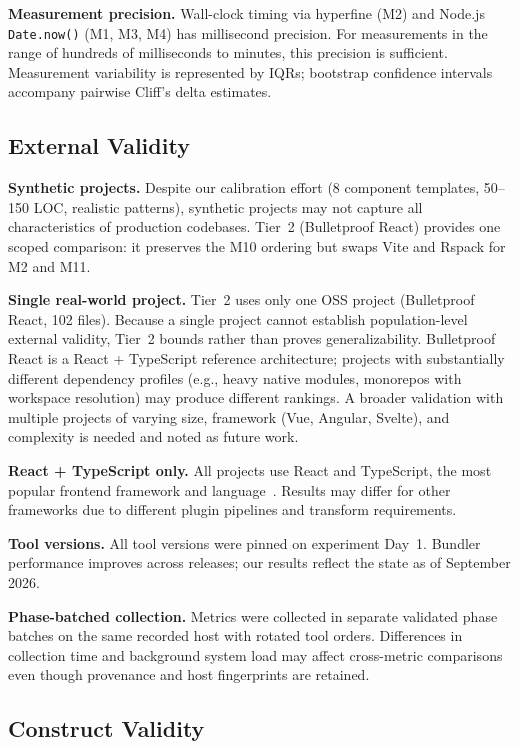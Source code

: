 \documentclass[preprint,12pt]{elsarticle}
\begin{document}
\textbf{Measurement precision.}
Wall-clock timing via hyperfine (M2) and Node.js \texttt{Date.now()} (M1, M3, M4) has millisecond precision.
For measurements in the range of hundreds of milliseconds to minutes, this precision is sufficient.
Measurement variability is represented by IQRs; bootstrap confidence intervals accompany pairwise Cliff's delta estimates.

\subsection{External Validity}

\textbf{Synthetic projects.}
Despite our calibration effort (8 component templates, 50--150 LOC, realistic patterns), synthetic projects may not capture all characteristics of production codebases.
Tier~2 (Bulletproof React) provides one scoped comparison: it preserves the M10 ordering but swaps Vite and Rspack for M2 and M11.

\textbf{Single real-world project.}
Tier~2 uses only one OSS project (Bulletproof React, 102 files).
Because a single project cannot establish population-level external validity, Tier~2 bounds rather than proves generalizability.
Bulletproof React is a React + TypeScript reference architecture; projects with substantially different dependency profiles (e.g., heavy native modules, monorepos with workspace resolution) may produce different rankings.
A broader validation with multiple projects of varying size, framework (Vue, Angular, Svelte), and complexity is needed and noted as future work.

\textbf{React + TypeScript only.}
All projects use React and TypeScript, the most popular frontend framework and language~\cite{stateofjs2025}.
Results may differ for other frameworks due to different plugin pipelines and transform requirements.

\textbf{Tool versions.}
All tool versions were pinned on experiment Day~1.
Bundler performance improves across releases; our results reflect the state as of September 2026.

\textbf{Phase-batched collection.}
Metrics were collected in separate validated phase batches on the same recorded host with rotated tool orders.
Differences in collection time and background system load may affect cross-metric comparisons even though provenance and host fingerprints are retained.

\subsection{Construct Validity}
\end{document}
